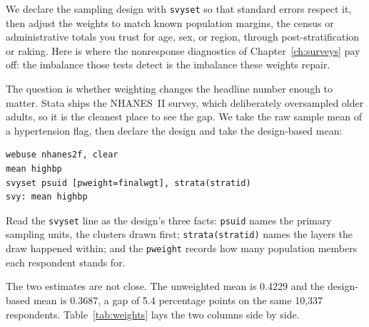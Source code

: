 We declare the sampling design with \texttt{svyset} so that standard errors respect it, then adjust the weights to match known population margins, the census or administrative totals you trust for age, sex, or region, through post-stratification or raking. Here is where the nonresponse diagnostics of Chapter~\ref{ch:surveys} pay off: the imbalance those tests detect is the imbalance these weights repair.

The question is whether weighting changes the headline number enough to matter. Stata ships the NHANES~II survey, which deliberately oversampled older adults, so it is the cleanest place to see the gap. We take the raw sample mean of a hypertension flag, then declare the design and take the design-based mean:
\par
{\footnotesize
\begin{verbatim}
webuse nhanes2f, clear
mean highbp
svyset psuid [pweight=finalwgt], strata(stratid)
svy: mean highbp
\end{verbatim}
}
Read the \texttt{svyset} line as the design's three facts: \texttt{psuid} names the primary sampling units, the clusters drawn first; \texttt{strata(stratid)} names the layers the draw happened within; and the \texttt{pweight} records how many population members each respondent stands for.

The two estimates are not close. The unweighted mean is 0.4229 and the design-based mean is 0.3687, a gap of 5.4 percentage points on the same 10{,}337 respondents. Table~\ref{tab:weights} lays the two columns side by side.

